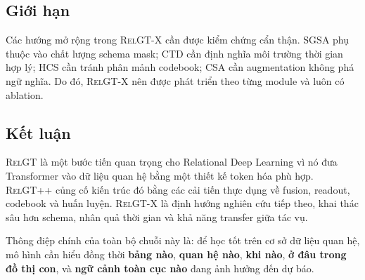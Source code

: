 \documentclass[12pt,a4paper]{article}
\newcommand{\RelGT}{\textsc{RelGT}}
\newcommand{\RelGTpp}{\textsc{RelGT++}}
\newcommand{\RelGTx}{\textsc{RelGT-X}}
\begin{document}
\subsection{Giới hạn}

Các hướng mở rộng trong \RelGTx{} cần được kiểm chứng cẩn thận. SGSA phụ thuộc
vào chất lượng schema mask; CTD cần định nghĩa môi trường thời gian hợp lý;
HCS cần tránh phân mảnh codebook; CSA cần augmentation không phá ngữ nghĩa.
Do đó, \RelGTx{} nên được phát triển theo từng module và luôn có ablation.

\subsection{Kết luận}

\RelGT{} là một bước tiến quan trọng cho Relational Deep Learning vì nó đưa
Transformer vào dữ liệu quan hệ bằng một thiết kế token hóa phù hợp. \RelGTpp{}
củng cố kiến trúc đó bằng các cải tiến thực dụng về fusion, readout, codebook
và huấn luyện. \RelGTx{} là định hướng nghiên cứu tiếp theo, khai thác sâu
hơn schema, nhân quả thời gian và khả năng transfer giữa tác vụ.

Thông điệp chính của toàn bộ chuỗi này là: để học tốt trên cơ sở dữ liệu quan
hệ, mô hình cần hiểu đồng thời \textbf{bảng nào}, \textbf{quan hệ nào},
\textbf{khi nào}, \textbf{ở đâu trong đồ thị con}, và \textbf{ngữ cảnh toàn
cục nào} đang ảnh hưởng đến dự báo.
\end{document}

